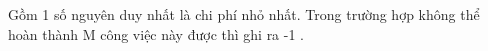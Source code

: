 Gồm 1 số nguyên duy nhất là chi phí nhỏ nhất. Trong trường hợp không thể hoàn thành M công việc này được thì ghi ra -1 .